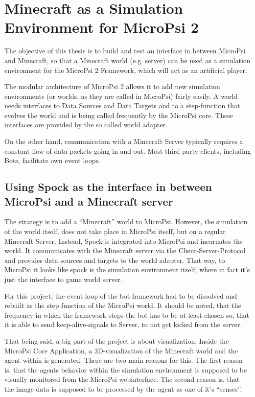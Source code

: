 \chapter{Minecraft as a Simulation Environment for MicroPsi 2}
The objective of this thesis is to build and test an interface in between MicroPsi and Minecraft, so that a Minecraft world (e.g. server) can be used as a simulation environment for the MicroPsi 2 Framework, which will act as an artificial player.

The modular architecture of MicroPsi 2 allows it to add new simulation environments (or worlds, as they are called in MicroPsi) fairly easily. A world needs interfaces to Data Sources and Data Targets and to a step-function that evolves the world and is being called frequently by the MicroPsi core. These interfaces are provided by the so called world adapter. 

On the other hand, communication with a Minecraft Server typically requires a constant flow of data packets going in and out. Most third party clients, including Bots, facilitate own event loops. 

    \section{Using Spock as the interface in between MicroPsi and a Minecraft server}
The strategy is to add a ``Minecraft'' world to MicroPsi. However, the simulation of the world itself, does not take place in MicroPsi itself, but on a regular Minecraft Server. Instead, Spock is integrated into MicroPsi and incarnates the world. It communicates with the Minecraft server via the Client-Server-Protocol and provides data sources and targets to the world adapter. That way, to MicroPsi it looks like spock is the simulation environment itself, where in fact it's just the interface to game world server.

For this project, the event loop of the bot framework had to be dissolved and rebuilt as the step function of the MicroPsi world. It should be noted, that the frequency in which the framework steps the bot has to be at least chosen so, that it is able to send keep-alive-signals to Server, to not get kicked from the server.

That being said, a big part of the project is about visualization. Inside the MicroPsi Core Application, a 3D-visualization of the Minecraft world and the agent within is generated. There are two main reasons for this. The first reason is, that the agents behavior within the simulation environment is supposed to be visually monitored from the MicroPsi webinterface. The second reason is, that the image data is supposed to be processed by the agent as one of it's ``senses''.

